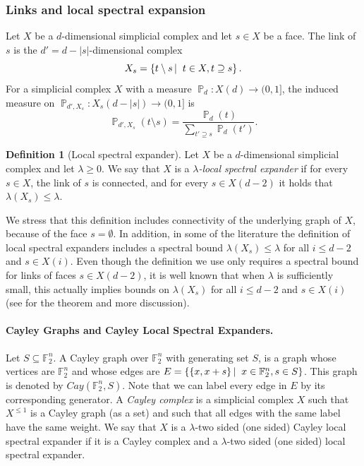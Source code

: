 \documentclass[10pt,a4paper]{article}
\theoremstyle{definition}
\newtheorem{definition}[theorem]{Definition}
\theoremstyle{remark}
\newcommand\sett[2]{\left\{ #1 \left| \; \vphantom{#1 #2} \right. #2  \right\}}
\newcommand{\set}[1]{\{#1\}}
\newcommand{\Psymb}{\mathbb{P}}
\DeclareMathOperator*{\ProbOp}{\Psymb}
\renewcommand{\Pr}{\ProbOp}
\renewcommand{\leq}{\leqslant}
\renewcommand{\geq}{\geqslant}
\numberwithin{equation}{section}
\let\origparagraph\paragraph
\renewcommand{\paragraph}[1]{\origparagraph{#1.}}
\begin{document}
\subsubsection{Links and local spectral expansion} \label{sec:prelims-lse}
Let \(X\) be a \(d\)-dimensional simplicial complex and let \(s \in X\) be a face. The link of \(s\) is the \(d'=d-|s|\)-dimensional complex
\[X_s = \sett{t \setminus s}{t \in X, t \supseteq s}.\] For a simplicial complex \(X\) with a measure \(\Pr_d:X(d) \to (0,1]\), the induced measure on \(\Pr_{d',X_s}:X_s(d-|s|)\to (0,1]\) is \[\Pr_{d',X_s}(t \setminus s) = \frac{\Pr_d(t)}{\sum_{t' \supseteq s} \Pr_d(t')}.\] 

\begin{definition}[Local spectral expander]
    Let \(X\) be a \(d\)-dimensional simplicial complex and let \(\lambda \geq 0\). We say that \(X\) 
    is a \emph{\(\lambda\)-local spectral expander} if for every \(s \in X\), the link of \(s\) is connected, and for every \(s \in X(d-2)\) it holds that \(\lambda(X_s) \leq \lambda\).
\end{definition}
We stress that this definition includes connectivity of the underlying graph of \(X\), because of the face \(s= \emptyset\). In addition, in some of the literature the definition of local spectral expanders includes a spectral bound \(\lambda(X_s) \leq \lambda\) for all \(i \leq d-2\) and \(s \in X(i)\). Even though the definition we use only requires a spectral bound for links of faces \(s \in X(d-2)\), it is well known that when \(\lambda\) is sufficiently small, this actually implies bounds on \(\lambda(X_s)\) for all \(i \leq d-2\) and \(s \in X(i)\) (see \cite{oppenheim2018local} for the theorem and more discussion).

\paragraph{Cayley Graphs and Cayley Local Spectral Expanders}
Let \(S \subseteq \mathbb{F}_2^n\). A Cayley graph over \(\mathbb{F}_2^n\) with generating set \(S\), is a graph whose vertices are \(\mathbb{F}_2^n\) and whose edges are \(E = \sett{\set{x,x+s}}{x \in \mathbb{F}_2^n, s \in S}\). This graph is denoted by \(Cay(\mathbb{F}_2^n,S)\). Note that we can label every edge in \(E\) by its corresponding generator. A \emph{Cayley complex} is a simplicial complex \(X\) such that \(X^{\leq 1}\) is a Cayley graph (as a set) and such that all edges with the same label have the same weight. We say that \(X\) is a \(\lambda\)-two sided (one sided) Cayley local spectral expander if it is a Cayley complex and a \(\lambda\)-two sided (one sided) local spectral expander.
\end{document}
